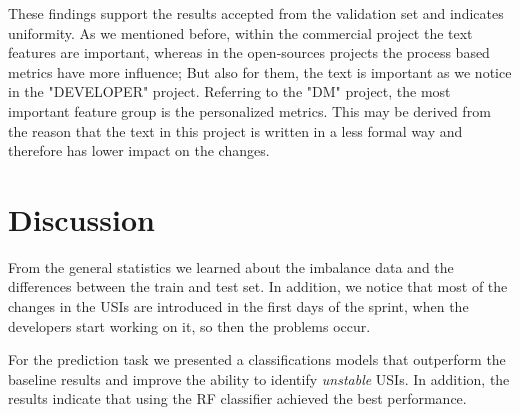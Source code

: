 These findings support the results accepted from the validation set and indicates uniformity. As we mentioned before, within the commercial project the text features are important, whereas in the open-sources projects the process based metrics have more influence; But also for them, the text is important as we notice in the "DEVELOPER" project. Referring to the "DM" project, the most important feature group is the personalized metrics. This may be derived from the reason that the text in this project is written in a less formal way and therefore has lower impact on the changes.


\section{Discussion}
\label{sec-discussion}
From the general statistics we learned about the imbalance data and the differences between the train and test set. In addition, we notice that most of the changes in the USIs are introduced in the first days of the sprint, when the developers start working on it, so then the problems occur. 

For the prediction task we presented a classifications models that outperform the baseline results and improve the ability to identify \emph{unstable} USIs.
In addition, the results indicate that using the RF classifier achieved the best performance.

